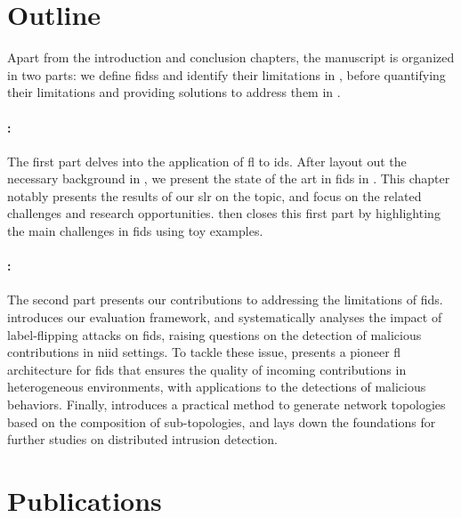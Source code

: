 \section{Outline\label{sec:intro.outline}}

Apart from the introduction and conclusion chapters, the manuscript is organized in two parts: we define \glspl{fids} and identify their limitations in , before quantifying their limitations and providing solutions to address them in .

\paragraph{:}

The first part delves into the application of \gls{fl} to \gls{ids}.
After layout out the necessary background in , we present the state of the art in \gls{fids} in .
This chapter notably presents the results of our \gls{slr} on the topic, and focus on the related challenges and research opportunities.
 then closes this first part by highlighting the main challenges in \gls{fids} using toy examples.

\paragraph{:}

The second part presents our contributions to addressing the limitations of \gls{fids}.
 introduces our evaluation framework, and systematically analyses the impact of label-flipping attacks on \gls{fids}, raising questions on the detection of malicious contributions in \gls{niid} settings.
To tackle these issue,  presents a pioneer \gls{fl} architecture for \gls{fids} that ensures the quality of incoming contributions in heterogeneous environments, with applications to the detections of malicious behaviors.
Finally,  introduces a practical method to generate network topologies based on the composition of sub-topologies, and lays down the foundations for further studies on distributed intrusion detection.


\section{Publications\label{sec:intro.publications}}

